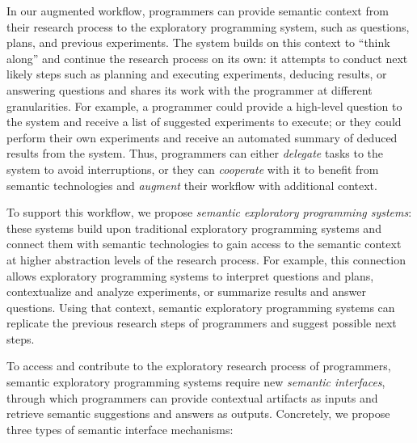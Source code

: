 In our augmented workflow, programmers can provide semantic context from their research process to the exploratory programming system, such as questions, plans, and previous experiments.
The system builds on this context to ``think along'' and continue the research process on its own:
it attempts to conduct next likely steps such as planning and executing experiments, deducing results, or answering questions and shares its work with the programmer at different granularities.
For example, a programmer could provide a high-level question to the system and receive a list of suggested experiments to execute; or they could perform their own experiments and receive an automated summary of deduced results from the system.
Thus, programmers can either \emph{delegate} tasks to the system to avoid interruptions, or they can \emph{cooperate} with it to benefit from semantic technologies and \emph{augment} their workflow with additional context.

To support this workflow, we propose \emph{semantic exploratory programming systems}:
these systems build upon traditional exploratory programming systems and connect them with semantic technologies to gain access to the semantic context at higher abstraction levels of the research process.
For example, this connection allows exploratory programming systems to interpret questions and plans, contextualize and analyze experiments, or summarize results and answer questions.
Using that context, semantic exploratory programming systems can replicate the previous research steps of programmers and suggest possible next steps.

To access and contribute to the exploratory research process of programmers, semantic exploratory programming systems require new \emph{semantic interfaces}, through which programmers can provide contextual artifacts as inputs and retrieve semantic suggestions and answers as outputs.
Concretely, we propose three types of semantic interface mechanisms:

